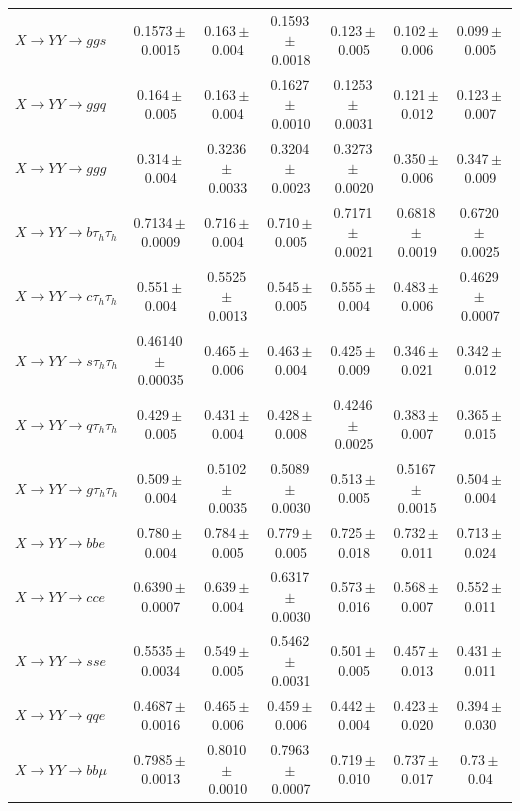 \begin{landscape}
{\begin{longtable}{@{\extracolsep{\fill}}lcccccc@{}}
$X\to YY\to ggs$ & 0.1573\,$\pm$\,0.0015 & 0.163\,$\pm$\,0.004 & 0.1593\,$\pm$\,0.0018 & 0.123\,$\pm$\,0.005 & 0.102\,$\pm$\,0.006 & 0.099\,$\pm$\,0.005 \\
$X\to YY\to ggq$ & 0.164\,$\pm$\,0.005 & 0.163\,$\pm$\,0.004 & 0.1627\,$\pm$\,0.0010 & 0.1253\,$\pm$\,0.0031 & 0.121\,$\pm$\,0.012 & 0.123\,$\pm$\,0.007 \\
$X\to YY\to ggg$ & 0.314\,$\pm$\,0.004 & 0.3236\,$\pm$\,0.0033 & 0.3204\,$\pm$\,0.0023 & 0.3273\,$\pm$\,0.0020 & 0.350\,$\pm$\,0.006 & 0.347\,$\pm$\,0.009 \\
\midrule
$X\to YY\to b\tau_h\tau_h$ & 0.7134\,$\pm$\,0.0009 & 0.716\,$\pm$\,0.004 & 0.710\,$\pm$\,0.005 & 0.7171\,$\pm$\,0.0021 & 0.6818\,$\pm$\,0.0019 & 0.6720\,$\pm$\,0.0025 \\
$X\to YY\to c\tau_h\tau_h$ & 0.551\,$\pm$\,0.004 & 0.5525\,$\pm$\,0.0013 & 0.545\,$\pm$\,0.005 & 0.555\,$\pm$\,0.004 & 0.483\,$\pm$\,0.006 & 0.4629\,$\pm$\,0.0007 \\
$X\to YY\to s\tau_h\tau_h$ & 0.46140\,$\pm$\,0.00035 & 0.465\,$\pm$\,0.006 & 0.463\,$\pm$\,0.004 & 0.425\,$\pm$\,0.009 & 0.346\,$\pm$\,0.021 & 0.342\,$\pm$\,0.012 \\
$X\to YY\to q\tau_h\tau_h$ & 0.429\,$\pm$\,0.005 & 0.431\,$\pm$\,0.004 & 0.428\,$\pm$\,0.008 & 0.4246\,$\pm$\,0.0025 & 0.383\,$\pm$\,0.007 & 0.365\,$\pm$\,0.015 \\
$X\to YY\to g\tau_h\tau_h$ & 0.509\,$\pm$\,0.004 & 0.5102\,$\pm$\,0.0035 & 0.5089\,$\pm$\,0.0030 & 0.513\,$\pm$\,0.005 & 0.5167\,$\pm$\,0.0015 & 0.504\,$\pm$\,0.004 \\
\midrule
$X\to YY\to bbe$ & 0.780\,$\pm$\,0.004 & 0.784\,$\pm$\,0.005 & 0.779\,$\pm$\,0.005 & 0.725\,$\pm$\,0.018 & 0.732\,$\pm$\,0.011 & 0.713\,$\pm$\,0.024 \\
$X\to YY\to cce$ & 0.6390\,$\pm$\,0.0007 & 0.639\,$\pm$\,0.004 & 0.6317\,$\pm$\,0.0030 & 0.573\,$\pm$\,0.016 & 0.568\,$\pm$\,0.007 & 0.552\,$\pm$\,0.011 \\
$X\to YY\to sse$ & 0.5535\,$\pm$\,0.0034 & 0.549\,$\pm$\,0.005 & 0.5462\,$\pm$\,0.0031 & 0.501\,$\pm$\,0.005 & 0.457\,$\pm$\,0.013 & 0.431\,$\pm$\,0.011 \\
$X\to YY\to qqe$ & 0.4687\,$\pm$\,0.0016 & 0.465\,$\pm$\,0.006 & 0.459\,$\pm$\,0.006 & 0.442\,$\pm$\,0.004 & 0.423\,$\pm$\,0.020 & 0.394\,$\pm$\,0.030 \\
$X\to YY\to bb\mu$ & 0.7985\,$\pm$\,0.0013 & 0.8010\,$\pm$\,0.0010 & 0.7963\,$\pm$\,0.0007 & 0.719\,$\pm$\,0.010 & 0.737\,$\pm$\,0.017 & 0.73\,$\pm$\,0.04 \\

\end{longtable}}
\end{landscape}

